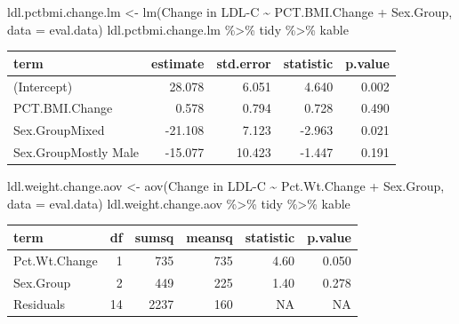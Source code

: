 \documentclass[
]{article}
\newenvironment{Shaded}{\begin{snugshade}}{\end{snugshade}}
\newcommand{\AttributeTok}[1]{\textcolor[rgb]{0.77,0.63,0.00}{#1}}
\newcommand{\FunctionTok}[1]{\textcolor[rgb]{0.00,0.00,0.00}{#1}}
\newcommand{\NormalTok}[1]{#1}
\newcommand{\OtherTok}[1]{\textcolor[rgb]{0.56,0.35,0.01}{#1}}
\newcommand{\SpecialCharTok}[1]{\textcolor[rgb]{0.00,0.00,0.00}{#1}}
\newcommand{\StringTok}[1]{\textcolor[rgb]{0.31,0.60,0.02}{#1}}
\begin{document}
\begin{Shaded}
\begin{Highlighting}[]
\NormalTok{ldl.pctbmi.change.lm }\OtherTok{\textless{}{-}} \FunctionTok{lm}\NormalTok{(}\StringTok{\textasciigrave{}}\AttributeTok{Change in LDL{-}C}\StringTok{\textasciigrave{}} \SpecialCharTok{\textasciitilde{}} \StringTok{\textasciigrave{}}\AttributeTok{PCT.BMI.Change}\StringTok{\textasciigrave{}} \SpecialCharTok{+} \StringTok{\textasciigrave{}}\AttributeTok{Sex.Group}\StringTok{\textasciigrave{}}\NormalTok{, }\AttributeTok{data =}\NormalTok{ eval.data)}
\NormalTok{ldl.pctbmi.change.lm }\SpecialCharTok{\%\textgreater{}\%}\NormalTok{ tidy }\SpecialCharTok{\%\textgreater{}\%}\NormalTok{ kable}
\end{Highlighting}
\end{Shaded}

\begin{longtable}[]{@{}lrrrr@{}}
\toprule
term & estimate & std.error & statistic & p.value \\
\midrule
\endhead
(Intercept) & 28.078 & 6.051 & 4.640 & 0.002 \\
PCT.BMI.Change & 0.578 & 0.794 & 0.728 & 0.490 \\
Sex.GroupMixed & -21.108 & 7.123 & -2.963 & 0.021 \\
Sex.GroupMostly Male & -15.077 & 10.423 & -1.447 & 0.191 \\
\bottomrule
\end{longtable}

\begin{Shaded}
\begin{Highlighting}[]
\NormalTok{ldl.weight.change.aov }\OtherTok{\textless{}{-}} \FunctionTok{aov}\NormalTok{(}\StringTok{\textasciigrave{}}\AttributeTok{Change in LDL{-}C}\StringTok{\textasciigrave{}} \SpecialCharTok{\textasciitilde{}} \StringTok{\textasciigrave{}}\AttributeTok{Pct.Wt.Change}\StringTok{\textasciigrave{}} \SpecialCharTok{+} \StringTok{\textasciigrave{}}\AttributeTok{Sex.Group}\StringTok{\textasciigrave{}}\NormalTok{, }\AttributeTok{data =}\NormalTok{ eval.data)}
\NormalTok{ldl.weight.change.aov }\SpecialCharTok{\%\textgreater{}\%}\NormalTok{ tidy }\SpecialCharTok{\%\textgreater{}\%}\NormalTok{ kable}
\end{Highlighting}
\end{Shaded}

\begin{longtable}[]{@{}lrrrrr@{}}
\toprule
term & df & sumsq & meansq & statistic & p.value \\
\midrule
\endhead
Pct.Wt.Change & 1 & 735 & 735 & 4.60 & 0.050 \\
Sex.Group & 2 & 449 & 225 & 1.40 & 0.278 \\
Residuals & 14 & 2237 & 160 & NA & NA \\
\bottomrule
\end{longtable}
\end{document}
